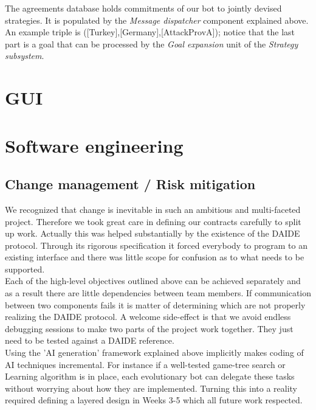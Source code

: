 \documentclass[pdftex,11pt,a4paper]{report}
\begin{document}
The agreements database holds commitments of our bot to jointly 
devised strategies. It is populated by the \textit{Message dispatcher}
component explained above. \\

An example triple is ([Turkey],[Germany],[AttackProvA]);
notice that the last part is a goal that can be processed by the
\textit{Goal expansion} unit of the \textit{Strategy subsystem}.



\chapter{GUI}



\pagebreak

\chapter{Software engineering}

\section{Change management / Risk mitigation}
We recognized that change is inevitable in such an ambitious and
multi-faceted project. Therefore we took great care in defining our
contracts carefully to split up work. Actually this was helped
substantially by the existence of the DAIDE protocol. Through its
rigorous specification it forced everybody to program to an existing
interface and there was little scope for confusion as to what needs to
be supported.  \\ Each of the high-level objectives outlined above can
be achieved separately and as a result there are little dependencies
between team members.  If communication between two components fails
it is matter of determining which are not properly realizing the DAIDE
protocol. A welcome side-effect is that we avoid endless debugging
sessions to make two parts of the project work together. They just
need to be tested against a DAIDE reference.  \\ Using the 'AI
generation' framework explained above implicitly makes coding of AI
techniques incremental. For instance if a well-tested game-tree search
or Learning algorithm is in place, each evolutionary bot can delegate
these tasks without worrying about how they are implemented. Turning
this into a reality required defining a layered design in Weeks 3-5
which all future work respected.  \\
\end{document}
